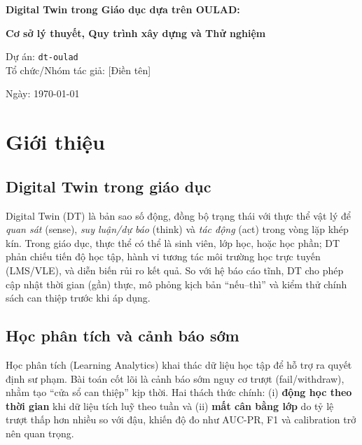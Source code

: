 \documentclass[12pt,a4paper]{article}
\newcommand{\proj}{dt-oulad}
\begin{document}
\begin{titlepage}
    \centering
    \vspace*{2cm}
    {\LARGE \textbf{Digital Twin trong Giáo dục dựa trên OULAD:}\par}
    \vspace{0.3cm}
    {\Large \textbf{Cơ sở lý thuyết, Quy trình xây dựng và Thử nghiệm}}

    \vspace{2cm}
    {\large Dự án: \texttt{\proj}\\}
    {\large Tổ chức/Nhóm tác giả: [Điền tên]}

    \vfill
    {\large Ngày: \today}
\end{titlepage}

\begin{abstract}
Bài tiểu luận trình bày một hệ thống Digital Twin (DT) cho giáo dục đại học được xây dựng trên bộ dữ liệu công khai Open University Learning Analytics Dataset (OULAD). Chúng tôi tổng hợp cơ sở lý thuyết của DT, học phân tích (Learning Analytics), mô hình chuỗi thời gian (LSTM), và hệ thống cảnh báo sớm; sau đó mô tả quy trình chuẩn từ ETL, huấn luyện mô hình, suy luận, mô phỏng thời gian thực tới bảng điều khiển. Kết quả thử nghiệm cho thấy DT hỗ trợ giám sát tiến độ, phát hiện rủi ro và cung cấp cảnh báo sớm hữu ích. Bài viết thảo luận giới hạn, khuyến nghị triển khai và hướng mở rộng.
\end{abstract}

\section{Giới thiệu}
\subsection{Digital Twin trong giáo dục}
Digital Twin (DT) là bản sao số động, đồng bộ trạng thái với thực thể vật lý để \emph{quan sát} (sense), \emph{suy luận/dự báo} (think) và \emph{tác động} (act) trong vòng lặp khép kín. Trong giáo dục, thực thể có thể là sinh viên, lớp học, hoặc học phần; DT phản chiếu tiến độ học tập, hành vi tương tác môi trường học trực tuyến (LMS/VLE), và diễn biến rủi ro kết quả. So với hệ báo cáo tĩnh, DT cho phép cập nhật thời gian (gần) thực, mô phỏng kịch bản ``nếu--thì'' và kiểm thử chính sách can thiệp trước khi áp dụng.

\subsection{Học phân tích và cảnh báo sớm}
Học phân tích (Learning Analytics) khai thác dữ liệu học tập để hỗ trợ ra quyết định sư phạm. Bài toán cốt lõi là cảnh báo sớm nguy cơ trượt (fail/withdraw), nhằm tạo ``cửa sổ can thiệp'' kịp thời. Hai thách thức chính: (i) \textbf{động học theo thời gian} khi dữ liệu tích luỹ theo tuần và (ii) \textbf{mất cân bằng lớp} do tỷ lệ trượt thấp hơn nhiều so với đậu, khiến độ đo như AUC-PR, F1 và calibration trở nên quan trọng.
\end{document}
